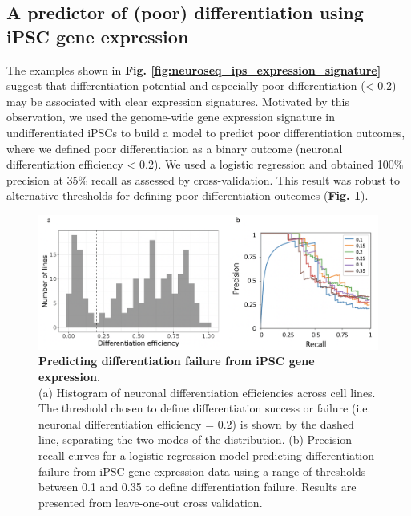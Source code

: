 \newpage

\subsection{A predictor of (poor) differentiation using iPSC gene expression}

The examples shown in \textbf{Fig. \ref{fig:neuroseq_ips_expression_signature}} suggest that differentiation potential and especially poor differentiation (< 0.2) may be associated with clear expression signatures.
Motivated by this observation, we used the genome-wide gene expression signature in undifferentiated iPSCs to build a model to predict poor differentiation outcomes, where we defined poor differentiation as a binary outcome (neuronal differentiation efficiency < 0.2).
We used a logistic regression and obtained 100\% precision at 35\% recall as assessed by cross-validation. 
This result was robust to alternative thresholds for defining poor differentiation outcomes (\textbf{Fig. \ref{fig:neuroseq_diff_eff_predictor}}). 

\begin{figure}[h]
\centering
\includegraphics[width=15.5cm]{Chapter5/Fig/neuroseq_diff_eff_predict.png}
\caption[Predicting differentiation failure from iPSC gene expression]{\textbf{Predicting differentiation failure from iPSC gene expression}.\\
(a) Histogram of neuronal differentiation efficiencies across cell lines. 
The threshold chosen to define differentiation success or failure (i.e. neuronal differentiation efficiency = 0.2) is shown by the dashed line, separating the two modes of the distribution. 
(b) Precision-recall curves for a logistic regression model predicting differentiation failure from iPSC gene expression data \cite{bonder2019systematic} using a range of thresholds between 0.1 and 0.35 to define differentiation failure. 
Results are presented from leave-one-out cross validation.}
\label{fig:neuroseq_diff_eff_predictor}
\end{figure}

